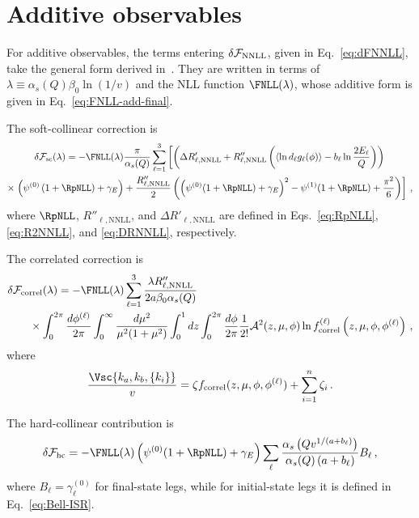 \chapter{Additive observables}
\label{ap:add-res-NNLL}

For additive observables, the terms entering
$\delta\mathcal{F}_{\rm NNLL}$, given in Eq.~\eqref{eq:dFNNLL}, take the
general form derived in~\cite{Arpino:2019ozn}. They are written in terms
of $\lambda \equiv \alpha_s(Q)\beta_0\ln(1/v)$ and the NLL function
$\FNLL(\lambda)$, whose additive form is given in
Eq.~\eqref{eq:FNLL-add-final}.
 
The soft-collinear correction is
\begin{multline}
 \label{eq:dFsc-general-add}
\delta\mathcal{F}_{\mathrm{sc}}(\lambda)=-\FNLL(\lambda)\frac{\pi}{\alpha_s(Q)}\sum_{\ell=1}^3\left[\left(\Delta R'_{\ell,\mathrm{NNLL}}+ R''_{\ell,\mathrm{NNLL}}\left(\langle \ln d_\ell g_\ell(\phi)\rangle-b_\ell\ln\frac{2E_\ell}{Q}\right)\right)\right. \\
\times \left.\left(\psi^{(0)}\left(1+\RpNLL\right)+\gamma_E\right)+\frac{R''_{\ell,\mathrm{NNLL}}}{2}\left(\left(\psi^{(0)}(1+\RpNLL)+\gamma_E\right)^2-\psi^{(1)}(1+\RpNLL)+\frac{\pi^2}{6}\right)\right]\,,
\end{multline}
where $\RpNLL$, $R''_{\ell,\mathrm{NNLL}}$, and
$\Delta R'_{\ell,\mathrm{NNLL}}$ are defined in
Eqs.~\eqref{eq:RpNLL}, \eqref{eq:R2NNLL}, and
\eqref{eq:DRNNLL}, respectively.

The correlated correction is
\begin{equation}
\begin{aligned}
\label{eq:dFcorrel-general-add}
&\delta\mathcal{F}_{\mathrm{correl}}(\lambda)=-\FNLL(\lambda)
\sum_{\ell=1}^3\frac{\lambda R''_{\ell,\mathrm{NNLL}}}{2a\beta_0\alpha_s(Q)}\\
&\qquad\times
\int_0^{2\pi}\frac{d\phi^{(\ell)}}{2\pi}\int_0^\infty
\frac{d\mu^2}{\mu^2(1+\mu^2)}\int_0^1dz\int_0^{2\pi}\frac{d\phi}{2\pi}\frac{1}{2!}\mathcal{A}^2(z,\mu,\phi)
\ln f^{(\ell)}_{\mathrm{correl}}\left(z,\mu,\phi,\phi^{(\ell)}\right)\,,
\end{aligned}
\end{equation}
where
\begin{equation}
	\frac{\Vsc{k_a,k_b,\{k_i\}}}{v}=\zeta f_{\rm correl}(z,\mu,\phi,\phi^{(\ell)})+\sum_{i=1}^n\zeta_i\,.
\end{equation}

The hard-collinear contribution is
\begin{equation}
  \label{eq:dFhc-general-add}
   \delta\mathcal{F}_{\rm hc}=-\FNLL(\lambda)\left(\psi^{(0)}(1+\RpNLL)+\gamma_E\right)\sum_\ell \frac{\alpha_s\left(Qv^{1/(a+b_\ell)}\right)}{\alpha_s(Q)\left(a+b_\ell\right)}B_\ell \,,
\end{equation}
where $B_\ell=\gamma_\ell^{(0)}$ for final-state legs, while for
initial-state legs it is defined in Eq.~\eqref{eq:Bell-ISR}.

